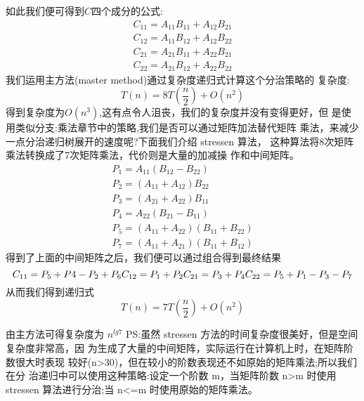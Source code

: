 如此我们便可得到$C$四个成分的公式:
$$
\begin{array}{l}
C_{11}=A_{11} B_{11}+A_{12} B_{21} \\
C_{12}=A_{11} B_{12}+A_{12} B_{22} \\
C_{21}=A_{21} B_{11}+A_{22} B_{21} \\
C_{22}=A_{21} B_{12}+A_{22} B_{22}
\end{array}
$$
我们运用主方法(master method)通过复杂度递归式计算这个分治策略的 复杂度:
$$
T(n)=8 T\left(\frac{n}{2}\right)+O\left(n^{2}\right)
$$
得到复杂度为$O(n^3)$,这有点令人沮丧，我们的复杂度并没有变得更好，但 是使用类似分支:乘法章节中的策略,我们是否可以通过矩阵加法替代矩阵 乘法，来减少一点分治递归树展开的速度呢?下面我们介绍 stressen 算法， 这种算法将8次矩阵乘法转换成了7次矩阵乘法，代价则是大量的加减操 作和中间矩阵。
$$
\begin{array}{c}
P_{1}=A_{11}\left(B_{12}-B_{22}\right) \\
P_{2}=\left(A_{11}+A_{12}\right) B_{22} \\
P_{3}=\left(A_{21}+A_{22}\right) B_{11} \\
P_{4}=A_{22}\left(B_{21}-B_{11}\right) \\
P_{5}=\left(A_{11}+A_{22}\right)\left(B_{11}+B_{22}\right) \\
P_{7}=\left(A_{11}+A_{21}\right)\left(B_{11}+B_{12}\right)
\end{array}
$$
得到了上面的中间矩阵之后，我们便可以通过组合得到最终结果
$$
C_{11}=P_{5}+P 4-P_{2}+P_{6}\\
C_{12}=P_{1}+P_{2} \\
C_{21}=P_{3}+P_{4} \\
C_{22}=P_{5}+P_{1}-P_{3}-P_{7}
$$
从而我们得到递归式
$$
T(n)=7 T\left(\frac{n}{2}\right)+O\left(n^{2}\right)
$$

由主方法可得复杂度为 $n^{lg 7}$
PS:虽然 stressen 方法的时间复杂度很美好，但是空间复杂度非常高，因 为生成了大量的中间矩阵，实际运行在计算机上时，在矩阵阶数很大时表现 较好(n>30)，但在较小的阶数表现还不如原始的矩阵乘法;所以我们在分 治递归中可以使用这种策略:设定一个阶数 m，当矩阵阶数 n>m 时使用 stressen 算法进行分治;当 n<=m 时使用原始的矩阵乘法。